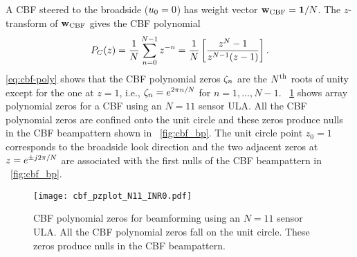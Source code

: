 A CBF steered to the broadside ($u_0 = 0$) has weight vector
${\bf w}_{\rm CBF} = \mathbf{1}/N$. The $z$-transform of ${\bf w}_{\rm CBF}$ gives the CBF
polynomial
\begin{align}
  \label{eq:cbf-poly}
  P_C(z) = \frac{1}{N}\sum\limits_{n=0}^{N-1}z^{-n} 
  = \frac{1}{N}\left[\frac{z^N - 1}{z^{N-1}(z - 1)}\right].
\end{align}
\eqn{}\eqref{eq:cbf-poly} shows that the CBF polynomial zeros
$\zeta_n$ are the $N^{\rm th}$ roots of unity except for the one at
$z = 1$, i.e., $\zeta_n = e^{2\pi n/N}$ for $n = 1,\ldots, N-1$.
\figurename{}~\ref{fig:unit-circle} shows array polynomial zeros for a
CBF using an $N = 11$ sensor ULA. All the CBF polynomial zeros are
confined onto the unit circle and these zeros produce nulls in the CBF
beampattern shown in \figurename{}~\ref{fig:cbf_bp}. The unit circle
point $z_0 = 1$ corresponds to the broadside look direction and the
two adjacent zeros at $z = e^{\pm j2\pi/N}$ are associated with the
first nulls of the CBF beampattern in \figurename{}~\ref{fig:cbf_bp}.

\begin{figure}[!hp]
 \centering
    \texttt{[image: cbf\_pzplot\_N11\_INR0.pdf]}
    \caption[CBF polynomial zeros for beamforming using an $N = 11$
      sensor ULA.]{CBF polynomial zeros for beamforming using an $N = 11$
      sensor ULA. All the CBF polynomial zeros fall on the unit circle. These zeros produce nulls in the CBF beampattern.}
    \label{fig:unit-circle}
\end{figure}

